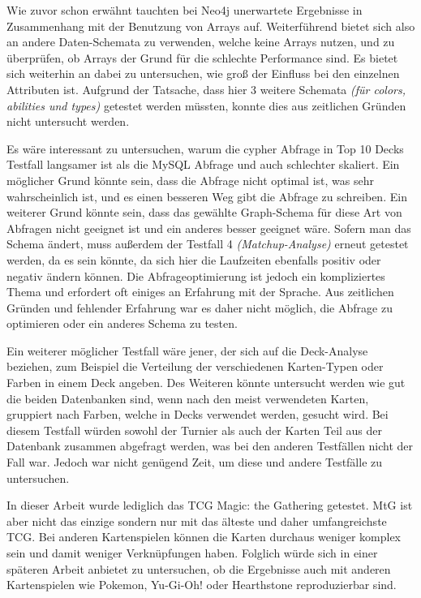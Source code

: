 Wie zuvor schon erwähnt tauchten bei Neo4j unerwartete Ergebnisse in Zusammenhang mit der Benutzung von Arrays auf. Weiterführend bietet sich also an andere Daten-Schemata zu verwenden, welche keine Arrays nutzen, und zu überprüfen, ob Arrays der Grund für die schlechte Performance sind. Es bietet sich weiterhin an dabei zu untersuchen, wie groß der Einfluss bei den einzelnen Attributen ist. Aufgrund der Tatsache, dass hier 3 weitere Schemata \emph{(für colors, abilities und types)} getestet werden müssten, konnte dies aus zeitlichen Gründen nicht untersucht werden.

Es wäre interessant zu untersuchen, warum die cypher Abfrage in Top 10 Decks Testfall langsamer ist als die MySQL Abfrage und auch schlechter skaliert. Ein möglicher Grund könnte sein, dass die Abfrage nicht optimal ist, was sehr wahrscheinlich ist, und es einen besseren Weg gibt die Abfrage zu schreiben. Ein weiterer Grund könnte sein, dass das gewählte Graph-Schema für diese Art von Abfragen nicht geeignet ist und ein anderes besser geeignet wäre. Sofern man das Schema ändert, muss außerdem der Testfall 4 \emph{(Matchup-Analyse)} erneut getestet werden, da es sein könnte, da sich hier die Laufzeiten ebenfalls positiv oder negativ ändern können. Die Abfrageoptimierung ist jedoch ein kompliziertes Thema und erfordert oft einiges an Erfahrung mit der Sprache. Aus zeitlichen Gründen und fehlender Erfahrung war es daher nicht möglich, die Abfrage zu optimieren oder ein anderes Schema zu testen.

Ein weiterer möglicher Testfall wäre jener, der sich auf die Deck-Analyse beziehen, zum Beispiel die Verteilung der verschiedenen Karten-Typen oder Farben in einem Deck angeben. Des Weiteren könnte untersucht werden wie gut die beiden Datenbanken sind, wenn nach den meist verwendeten Karten, gruppiert nach Farben, welche in Decks verwendet werden, gesucht wird. Bei diesem Testfall würden sowohl der Turnier als auch der Karten Teil aus der Datenbank zusammen abgefragt werden, was bei den anderen Testfällen nicht der Fall war. Jedoch war nicht genügend Zeit, um diese und andere Testfälle zu untersuchen.

In dieser Arbeit wurde lediglich das \ac{TCG} Magic: the Gathering getestet. \ac{MtG} ist aber nicht das einzige sondern nur mit das älteste und daher umfangreichste \ac{TCG}. Bei anderen Kartenspielen können die Karten durchaus weniger komplex sein und damit weniger Verknüpfungen haben. Folglich würde sich in einer späteren Arbeit anbietet zu untersuchen, ob die Ergebnisse auch mit anderen Kartenspielen wie Pokemon, Yu-Gi-Oh! oder Hearthstone reproduzierbar sind. 
